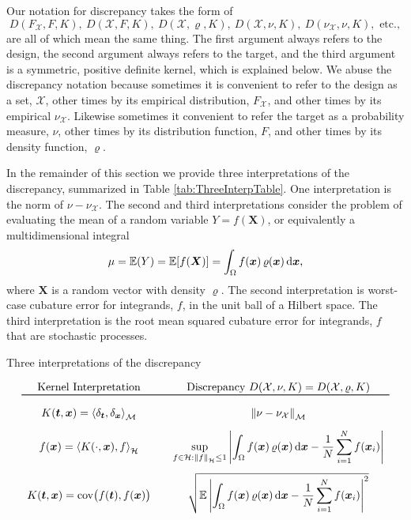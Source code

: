 \documentclass[graybox]{svmult}
\newcommand{\vx}{\boldsymbol{x}}
\newcommand{\vX}{\boldsymbol{X}}
\newcommand{\vt}{\boldsymbol{t}}
\newcommand{\dif}{{\rm d}}
\newcommand{\Xdes}{\mathcal{X}}
\newcommand{\cm}{\mathcal{M}}
\newcommand{\ch}{\mathcal{H}}
\newcommand{\Ex}{\mathbb{E}}
\newcommand{\ip}[3][{}]{\ensuremath{\left \langle #2, #3 \right \rangle_{#1}}}
\newcommand{\norm}[2][{}]{\ensuremath{\left \lVert #2 \right \rVert}_{#1}}
\DeclareMathOperator{\cov}{cov}
\def\abs#1{\ensuremath{\left \lvert #1 \right \rvert}}
\begin{document}
Our notation for discrepancy takes the form of 
\[
 D(F_{\Xdes},F,K), \ D(\Xdes,F,K), \ D(\Xdes,\varrho,K), \ D(\Xdes,\nu,K), \ D(\nu_{\Xdes},\nu,K), \text{ etc.}, 
\]
are all of which mean the same thing.  The first argument always refers to the design, the second argument always refers to the target, and the third argument is a symmetric, positive definite kernel, which is explained below.  We abuse the discrepancy notation because sometimes it is convenient to refer to the design as a set, $\Xdes$, other times by its empirical distribution, $F_{\Xdes}$, and other times by its empirical $\nu_{\Xdes}$.  Likewise sometimes it convenient to refer the target as a probability measure,  $\nu$, other times by its distribution function, $F$, and other times by its density function, $\varrho$.

In the remainder of this section we provide three interpretations of the discrepancy, summarized in Table \ref{tab:ThreeInterpTable}.  One interpretation is the norm of $\nu - \nu_{\Xdes}$.  The second and third interpretations consider the problem of evaluating the mean of a random variable $Y=f(\vX)$, or equivalently a multidimensional integral
\[
\mu = \Ex(Y) = \Ex[f(\vX)] = \int_{\Omega} f(\vx) \, \varrho(\vx) \, \dif \vx,
\]
where $\vX$ is a random vector with density $\varrho$. The second
interpretation is worst-case cubature error for integrands, $f$, in the unit ball of a Hilbert space.  The third interpretation is the root mean squared cubature error for integrands, $f$ that are stochastic processes.

\begin{table}
    \centering
     \caption{Three interpretations of the discrepancy}
     \vspace{-3ex}
\begin{equation*}
\begin{array}{c@{\qquad}ccc}
     \text{Kernel Interpretation} & \text{Discrepancy } D(\Xdes,\nu,K) = D(\Xdes,\varrho,K)\\
     \toprule \\[-1ex]
     K(\vt,\vx) = \ip[\cm]{\delta_{\vt}}{\delta_{\vx}} & \norm[\cm]{\nu - \nu_{\Xdes}} \\[2ex]
     f(\vx) = \ip[\ch]{K(\cdot,\vx)}{f} & \displaystyle \sup_{f \in \ch : \norm[\ch]{f} \le 1} \abs{\int_{\Omega} f(\vx) \, \varrho(\vx) \, \dif \vx - \frac 1N \sum_{i=1}^N f(\vx_i)}\\[4ex]
    K(\vt,\vx) = \cov\bigl(f(\vt), f(\vx) \bigr) & \displaystyle \sqrt{\Ex \abs{\int_{\Omega} f(\vx) \, \varrho(\vx) \, \dif \vx - \frac 1N \sum_{i=1}^N f(\vx_i)}^2}\\
\end{array}
\end{equation*}
    \label{tab:ThreeInterpTable}
\end{table}
\end{document}
